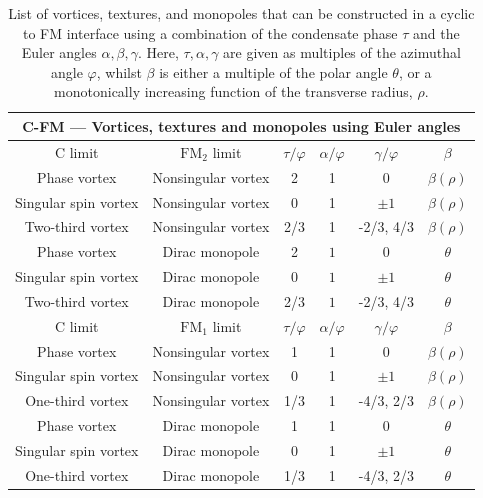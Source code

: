 \begin{table}
    \centering
    \begin{tabular}{cccccc}
        \toprule
        \multicolumn{6}{c}{C-FM --- Vortices, textures and monopoles using Euler
            angles} \\
        \midrule
        C limit & \(\text{FM}_2\) limit &  \(\tau/\varphi\) & \(\alpha/\varphi\)
            & \(\gamma/\varphi\) & \(\beta\) \\
        \midrule
        Phase vortex & Nonsingular vortex & 2 & 1 & 0 & \(\beta(\rho)\) \\ 
        Singular spin vortex & Nonsingular vortex & 0 & 1 & \(\pm 1\)
            & \(\beta(\rho)\) \\ 
        Two-third vortex & Nonsingular vortex & 2/3 & 1 & -2/3, 4/3
            & \(\beta(\rho)\) \\
        Phase vortex & Dirac monopole & 2 & \(1\) & 0 & \(\theta\) \\ 
        Singular spin vortex & Dirac monopole & 0 & \( 1\) & \(\pm 1\)
            & \(\theta\) \\ 
        Two-third vortex & Dirac monopole & 2/3 & \( 1\) & -2/3, 4/3
            & \(\theta\) \\
        \bottomrule
        \midrule
        C limit & \(\text{FM}_1\) limit &  \(\tau/\varphi\) & \(\alpha/\varphi\)
            & \(\gamma/\varphi\) & \(\beta\) \\
        \midrule
        Phase vortex & Nonsingular vortex & 1 & 1 & 0 & \(\beta(\rho)\) \\ 
        Singular spin vortex & Nonsingular vortex & 0 & 1 & \(\pm 1\)
            & \(\beta(\rho)\) \\ 
        One-third vortex & Nonsingular vortex & 1/3 & 1 & -4/3, 2/3
            & \(\beta(\rho)\) \\
        Phase vortex & Dirac monopole & 1 & 1 & 0 & \(\theta\) \\ 
        Singular spin vortex & Dirac monopole & 0 & 1 & \(\pm 1\) & \(\theta\)\\ 
        One-third vortex & Dirac monopole & 1/3 & 1 & -4/3, 2/3 & \(\theta\) \\
        \bottomrule
    \end{tabular}
    \caption[Examples of vortices, textures, and monopoles that can be
    constructed using Euler angles in a cyclic to ferromagnetic interface.]
    {\label{tab: C-FM-other}List of vortices, textures, and monopoles
    that can be constructed in a cyclic to FM interface using a combination
    of the condensate phase \(\tau\) and the Euler angles \(\alpha, \beta,
    \gamma\).
    Here, \(\tau, \alpha, \gamma\) are given as multiples of the azimuthal angle
    \(\varphi\), whilst \(\beta\) is either a multiple of the polar angle
    \(\theta\), or a monotonically increasing function of the transverse radius,
    \(\rho\).}
\end{table}

